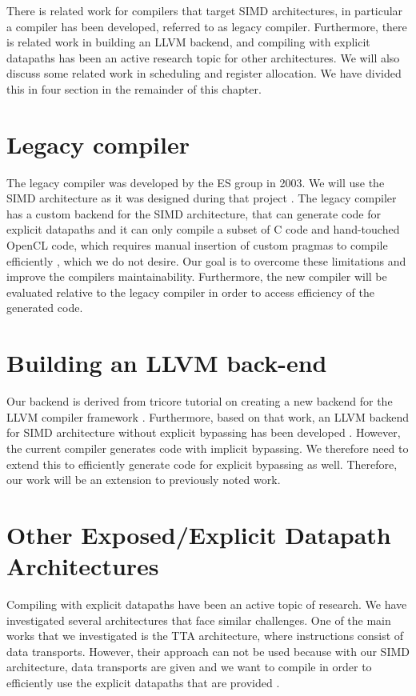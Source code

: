 There is related work for compilers that target SIMD architectures, in particular a compiler has been developed, referred to as legacy compiler. Furthermore, there is related work in building an LLVM backend, and compiling with explicit datapaths has been an active research topic for other architectures. We will also discuss some related work in scheduling and register allocation. We have divided this in four section in the remainder of this chapter.

\section{Legacy compiler}
The legacy compiler was developed by the ES group in 2003. We will use the SIMD architecture as it was designed during that project \cite{simd}. The legacy compiler has a custom backend for the SIMD architecture, that can generate code for explicit datapaths \cite{dongrio1} and it can only compile a subset of C code and hand-touched OpenCL code, which requires manual insertion of custom pragmas to compile efficiently \cite{dongrio2}, which we do not desire. Our goal is to overcome these limitations and improve the compilers maintainability. Furthermore, the new compiler will be evaluated relative to the legacy compiler in order to access efficiency of the generated code.

\section{Building an LLVM back-end}
Our backend is derived from tricore tutorial on creating a new backend for the LLVM compiler framework \cite{tricore}. Furthermore, based on that work, an LLVM backend for SIMD architecture without explicit bypassing has been developed \cite{liu_zhenyuan}. However, the current compiler generates code with implicit bypassing. We therefore need to extend this to efficiently generate code for explicit bypassing as well. Therefore, our work will be an extension to previously noted work.

\section{Other Exposed/Explicit Datapath Architectures}
Compiling with explicit datapaths have been an active topic of research. We have investigated several architectures that face similar challenges. One of the main works that we investigated is the TTA architecture, where instructions consist of data transports. However, their approach can not be used because with our SIMD architecture, data transports are given and we want to compile in order to efficiently use the explicit datapaths that are provided \cite{tta, tta_codegen}.

